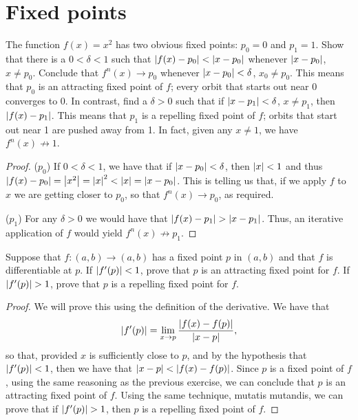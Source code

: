\section{Fixed points}


\begin{exercise}{36}
The function $f(x)=x^2$ has two obvious fixed points: $p_0=0$ and $p_1=1$.
Show that there is a $0<\delta<1$ such that $\left\lvert f(x)-p_0\right\rvert<\left\lvert x-p_0\right\rvert$ whenever $\left\lvert x-p_0\right\rvert$, $x\neq p_0$.
Conclude that $f^n(x)\to p_0$ whenever $\left\lvert x-p_0\right\rvert<\delta$, $x_0\neq p_0$.
This means that $p_0$ is an attracting fixed point of $f$;
every orbit that starts out near 0 converges to 0.
In contrast, find a $\delta>0$ such that if $\left\lvert x-p_1\right\rvert<\delta$, $x\neq p_1$, then $\left\lvert f(x)-p_1\right\rvert$.
This means that $p_1$ is a repelling fixed point of $f$;
orbits that start out near 1 are pushed away from 1.
In fact, given any $x\neq 1$, we have $f^n(x)\not\to 1$.
\end{exercise}
\begin{proof}
($p_0$)
If $0<\delta<1$, we have that if $\left\lvert x-p_0\right\rvert<\delta$, then $\left\lvert x\right\rvert<1$ and thus $\left\lvert f(x)-p_0\right\rvert = \left\lvert x^2\right\rvert = \left\lvert x\right\rvert^2 < \left\lvert x\right\rvert = \left\lvert x-p_0\right\rvert$.
This is telling us that, if we apply $f$ to $x$ we are getting closer to $p_0$, so that $f^n(x)\to p_0$, as required.

($p_1$)
For any $\delta>0$ we would have that $\left\lvert f(x)-p_1\right\rvert > \left\lvert x-p_1\right\rvert$.
Thus, an iterative application of $f$ would yield $f^n(x)\not\to p_1$.
\end{proof} 

\begin{exercise}{37}
Suppose that $f:(a,b)\to(a,b)$ has a fixed point $p$ in $(a,b)$ and that $f$ is differentiable at $p$.
If $\left\lvert f'(p)\right\rvert<1$, prove that $p$ is an attracting fixed point for $f$.
If $\left\lvert f'(p)\right\rvert>1$, prove that $p$ is a repelling fixed point for $f$.
\end{exercise}
\begin{proof}
We will prove this using the definition of the derivative.
We have that 
\begin{align*}
    \left\lvert f'(p)\right\rvert = \lim_{x\to p} \frac{\left\lvert f(x)-f(p)\right\rvert}{\left\lvert x-p\right\rvert},
\end{align*}
so that, provided $x$ is sufficiently close to $p$, and by the hypothesis that $\left\lvert f'(p)\right\rvert<1$, then we have that $\left\lvert x-p\right\rvert<\left\lvert f(x)-f(p)\right\rvert$.
Since $p$ is a fixed point of $f$, using the same reasoning as the previous exercise, we can conclude that $p$ is an attracting fixed point of $f$.
Using the same technique, mutatis mutandis, we can prove that if $\left\lvert f'(p)\right\rvert>1$, then $p$ is a repelling fixed point of $f$.
\end{proof} 

